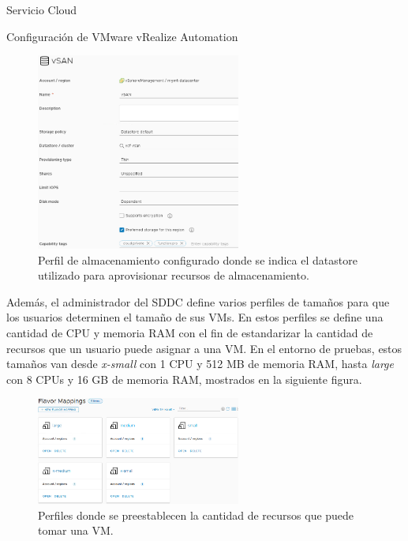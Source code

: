 \begin{subsection}{Servicio Cloud}
\begin{subsubsection}{Configuración de VMware vRealize Automation}
        \begin{figure}[h]
            \centering
            \includegraphics[width=0.6\textwidth]{imaxes/pruebaconcepto/vrealize/datastore-policy.png}
            \caption{Perfil de almacenamiento configurado donde se indica el datastore utilizado para aprovisionar recursos de almacenamiento.}
            \label{fig:storage-policy}
        \end{figure}
        \FloatBarrier
        Además, el administrador del SDDC define varios perfiles de tamaños para que los usuarios determinen el tamaño de sus VMs. En estos perfiles se define una cantidad de CPU y memoria RAM con el fin de estandarizar la cantidad de recursos que un usuario puede asignar a una VM. En el entorno de pruebas, estos tamaños van desde \textit{x-small} con 1 CPU y 512 MB de memoria RAM, hasta \textit{large} con 8 CPUs y 16 GB de memoria RAM, mostrados en la siguiente figura.
        \begin{figure}[h]
            \centering
            \includegraphics[width=0.6\textwidth]{imaxes/pruebaconcepto/vrealize/flavor-mapping.png}
            \caption{Perfiles donde se preestablecen la cantidad de recursos que puede tomar una VM.}
            \label{fig:falvor-mapping}
        \end{figure}
        \FloatBarrier

\end{subsubsection}
\end{subsection}
